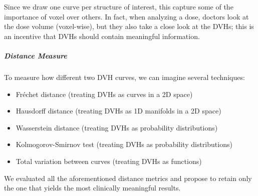 Since we draw one curve per structure of interest, this capture some of the importance of voxel over others.
In fact, when analyzing a dose, doctors look at the dose volume (voxel-wise), but they also take a close look at the DVHs; this is an incentive that DVHs should contain meaningful information.

\subparagraph{Distance Measure}
To measure how different two DVH curves, we can imagine several techniques:
\begin{itemize}
	\item Fréchet distance (treating DVHs as curves in a 2D space)
	\item Hausdorff distance (treating DVHs as 1D manifolds in a 2D space)
	\item Wasserstein distance (treating DVHs as probability distributions)
	\item Kolmogorov-Smirnov test (treating DVHs as probability distributions)
	\item Total variation between curves (treating DVHs as functions)
\end{itemize}
We evaluated all the aforementioned distance metrics and propose to retain only the one that yields the most clinically meaningful results.


